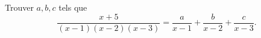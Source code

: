 Trouver $a, b, c$ tels que
\[ \frac{x + 5}{(x - 1)(x - 2)(x - 3)} = \frac{a}{x - 1} + \frac{b}{x - 2} + \frac{c}{x - 3}. \]

